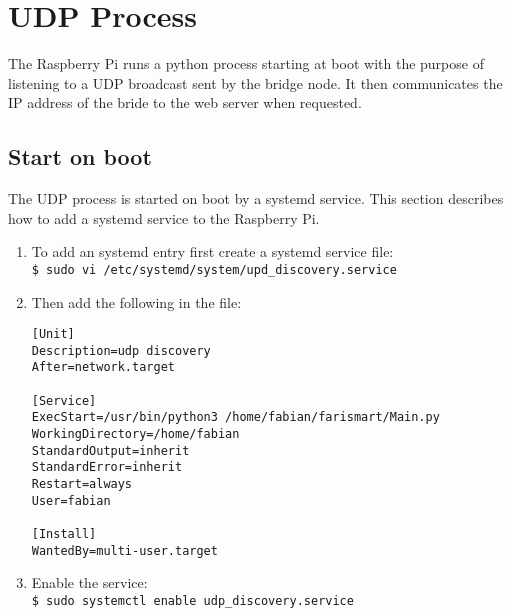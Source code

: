 \section{UDP Process}
The Raspberry Pi runs a python process starting at boot with
the purpose of listening to a UDP broadcast sent by the bridge
node. It then communicates the IP address of the bride to the
web server when requested.

    \subsection{Start on boot}
    The UDP process is started on boot by a systemd service.
    This section describes how to add a systemd service to the
    Raspberry Pi.

    \begin{enumerate}
        \item To add an systemd entry first create a systemd service file: \\
        \texttt{\$ sudo vi /etc/systemd/system/upd\_discovery.service}

        \item Then add the following in the file:
        \begin{lstlisting}[style=cppCode]
[Unit]
Description=udp discovery
After=network.target

[Service]
ExecStart=/usr/bin/python3 /home/fabian/farismart/Main.py
WorkingDirectory=/home/fabian
StandardOutput=inherit
StandardError=inherit
Restart=always
User=fabian

[Install]
WantedBy=multi-user.target
        \end{lstlisting}

        \item Enable the service: \\
        \texttt{\$ sudo systemctl enable udp\_discovery.service}
    \end{enumerate}
    
